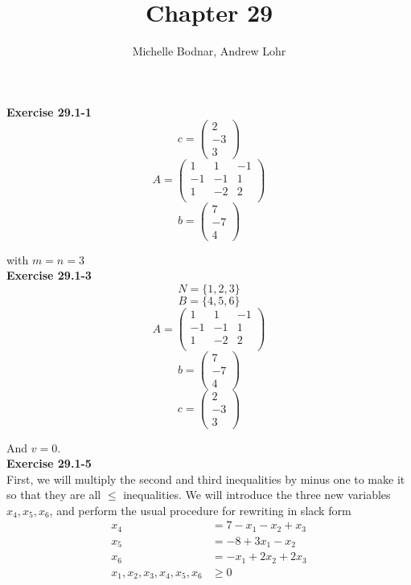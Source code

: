 \documentclass{article}
\title{Chapter 29}
\author{Michelle Bodnar, Andrew Lohr}
\begin{document}
\maketitle
\noindent\textbf{Exercise 29.1-1}\\
\[
c= \left(\begin{array}{c}2\\-3\\3\end{array}\right)
\]
\[
A = \left(\begin{array}{ccc}
1&1&-1\\
-1&-1&1\\
1&-2&2\\
\end{array}\right)
\]
\[
b= \left(\begin{array}{c}7\\-7\\4\end{array}\right)
\]

with $m=n=3$\\

\noindent\textbf{Exercise 29.1-3}\\

\[
N = \{1,2,3\}
\]
\[
B = \{4,5,6\}
\]
\[
A = \left(\begin{array}{ccc}
1&1&-1\\
-1&-1&1\\
1&-2&2\\
\end{array}\right)
\]
\[
b= \left(\begin{array}{c}7\\-7\\4\end{array}\right)
\]
\[
c= \left(\begin{array}{c}2\\-3\\3\end{array}\right)
\]

And $v=0$.\\

\noindent\textbf{Exercise 29.1-5}\\
First, we will multiply the second and third inequalities by minus one to make it so that they are all $\le$ inequalities. We will introduce the three new variables $x_4,x_5,x_6$, and perform the usual procedure for rewriting in slack form
\begin{align*}
x_4 &= 7-x_1 - x_2 +x_3\\
x_5 &= -8 +3x_1 - x_2\\
x_6 &= -x_1+2x_2 +2x_3\\
x_1,x_2,x_3,x_4,x_5,x_6 &\ge 0
\end{align*}
\end{document}
